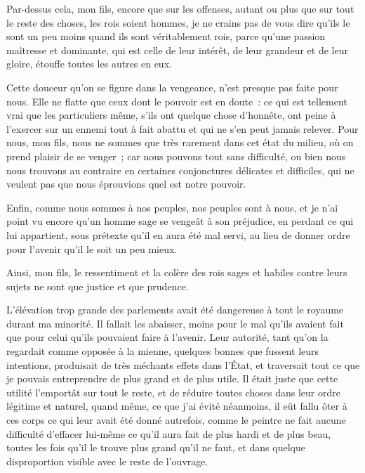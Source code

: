 \documentclass[french,twoside]{book} %
\begin{document}
Par-dessus cela, mon fils, encore que sur les offenses, autant ou plus que sur tout le reste des choses, les rois soient hommes, je ne crains pas de vous dire qu’ils le sont un peu moins quand ils sont véritablement rois, parce qu’une passion maîtresse et dominante, qui est celle de leur intérêt, de leur grandeur et de leur gloire, étouffe toutes les autres en eux.\par
Cette douceur qu’on se figure dans la vengeance, n’est presque pas faite pour nous. Elle ne flatte que ceux dont le pouvoir est en doute : ce qui est tellement vrai que les particuliers même, s’ils ont quelque chose d’honnête, ont peine à l’exercer sur un ennemi tout à fait abattu et qui ne s’en peut jamais relever. Pour nous, mon fils, nous ne sommes que très rarement dans cet état du milieu, où on prend plaisir de se venger ; car nous pouvons tout sans difficulté, ou bien nous nous trouvons au contraire en certaines conjonctures délicates et difficiles, qui ne veulent pas que nous éprouvions quel est notre pouvoir.\par
Enfin, comme nous sommes à nos peuples, nos peuples sont à nous, et je n’ai point vu encore qu’un homme sage se vengeât à son préjudice, en perdant ce qui lui appartient, sous prétexte qu’il en aura été mal servi, au lieu de donner ordre pour l’avenir qu’il le soit un peu mieux.\par
Ainsi, mon fils, le ressentiment et la colère des rois sages et habiles contre leurs sujets ne sont que justice et que prudence.\par
L’élévation trop grande des parlements avait été dangereuse à tout le royaume durant ma minorité. Il fallait les abaisser, moins pour le mal qu’ils avaient fait que pour celui qu’ils pouvaient faire à l’avenir. Leur autorité, tant qu’on la regardait comme opposée à la mienne, quelques bonnes que fussent leurs intentions, produisait de très méchants effets dans l’État, et traversait tout ce que je pouvais entreprendre de plus grand et de plus utile. Il était juste que cette utilité l’emportât sur tout le reste, et de réduire toutes choses dans leur ordre légitime et naturel, quand même, ce que j’ai évité néanmoins, il eût fallu ôter à ces corps ce qui leur avait été donné autrefois, comme le peintre ne fait aucune difficulté d’effacer lui-même ce qu’il aura fait de plus hardi et de plus beau, toutes les fois qu’il le trouve plus grand qu’il ne faut, et dans quelque disproportion visible avec le reste de l’ouvrage.\par
\end{document}
